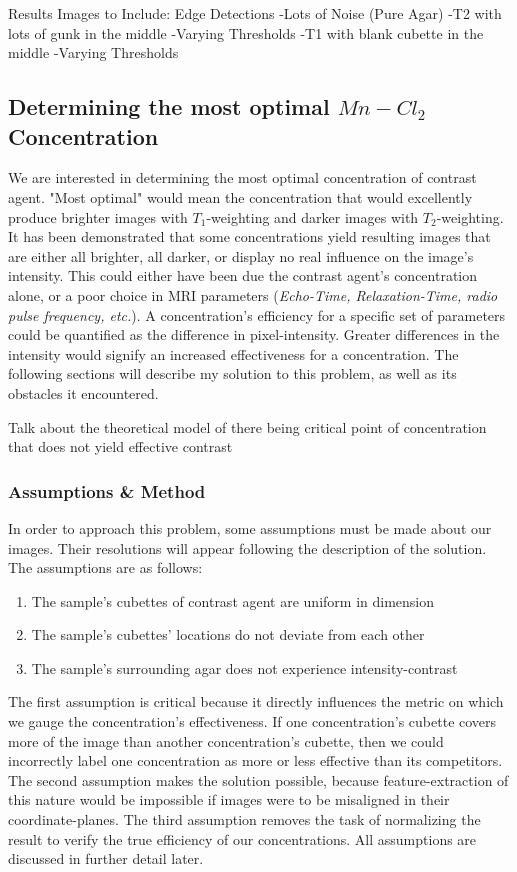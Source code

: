 \documentclass[a4paper,12pt]{article}
\begin{document}
\begin{section}{Results}
Images to Include: Edge Detections
	-Lots of Noise (Pure Agar)
	-T2 with lots of gunk in the middle
		-Varying Thresholds
	-T1 with blank cubette in the middle
		-Varying Thresholds

\subsection{Determining the most optimal $Mn-Cl_2$ Concentration}

We are interested in determining the most optimal concentration of contrast agent. "Most optimal" would mean the concentration that would excellently produce brighter images with $T_1$-weighting and darker images with $T_2$-weighting. It has been demonstrated that some concentrations yield resulting images that are either all brighter, all darker, or display no real influence on the image's intensity. This could either have been due the contrast agent's concentration alone, or a poor choice in MRI parameters ({\em Echo-Time, Relaxation-Time, radio pulse frequency, etc.}). A concentration's efficiency for a specific set of parameters could be quantified as the difference in pixel-intensity. Greater differences in the intensity would signify an increased effectiveness for a concentration. The following sections will describe my solution to this problem, as well as its obstacles it encountered.

Talk about the theoretical model of there being critical point of concentration that does not yield effective contrast

\subsubsection{Assumptions \& Method}

In order to approach this problem, some assumptions must be made about our images. Their resolutions will appear following the description of the solution. The assumptions are as follows:

\singlespacing
\begin{enumerate}
\item The sample's cubettes of contrast agent are uniform in dimension
\item The sample's cubettes' locations do not deviate from each other
\item The sample's surrounding agar does not experience intensity-contrast
\end{enumerate}
\doublespacing

The first assumption is critical because it directly influences the metric on which we gauge the concentration's effectiveness. If one concentration's cubette covers more of the image than another concentration's cubette, then we could incorrectly label one concentration as more or less effective than its competitors. The second assumption makes the solution possible, because feature-extraction of this nature would be impossible if images were to be misaligned in their coordinate-planes. The third assumption removes the task of normalizing the result to verify the true efficiency of our concentrations. All assumptions are discussed in further detail later.


\end{section}
\end{document}
